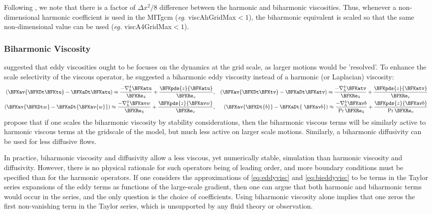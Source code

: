Following \cite{griffies:00}, we note that there is a factor of $\Delta
x^2/8$ difference between the harmonic and biharmonic viscosities.
Thus, whenever a non-dimensional harmonic coefficient is used in the
MITgcm (\textit{eg.} {\sf viscAhGridMax}$<1$), the biharmonic equivalent is
scaled so that the same non-dimensional value can be used (\textit{eg.} {\sf
  viscA4GridMax}$<1$).

\subsubsection{Biharmonic Viscosity}
\cite{ho78} suggested that eddy viscosities ought to be focuses on
the dynamics at the grid scale, as larger motions would be 'resolved'.
To enhance the scale selectivity of the viscous operator, he suggested
a biharmonic eddy viscosity instead of a harmonic (or Laplacian)
viscosity:
\begin{eqnarray}
\left({\BFKav{\BFKDt \BFKtu}}-{\BFKaDt \BFKatu}\right)\approx
\frac{-\nabla^4_h{\BFKatu}}{\BFKRe_4}
+\frac{\BFKpds{z}{\BFKatu}}{\BFKRe_v}\label{eq:bieddyvisc}, & &
\left({\BFKav{\BFKDt \BFKtv}}-{\BFKaDt \BFKatv}\right)\approx
\frac{-\nabla^4_h{\BFKatv}}{\BFKRe_4}
+\frac{\BFKpds{z}{\BFKatv}}{\BFKRe_v}\nonumber\\
\left(\BFKav{\BFKDt w}-\BFKaDt
  {\BFKav{w}}\right)\approx\frac{-\nabla^4_h\BFKav
  w}{\BFKRe_4}+\frac{\BFKpds{z}{\BFKav w}}{\BFKRe_v}\nonumber, & &
\left(\BFKav{\BFKDt{b}}-\BFKaDt{\ \BFKav b} \right)\approx
\frac{-\nabla^4_h \BFKav b}{\Pr\BFKRe_4}
+\frac{\BFKpds{z} {\BFKav b}}{\Pr\BFKRe_v}\nonumber
\end{eqnarray}
\cite{griffies:00} propose that if one scales the biharmonic viscosity by
stability considerations, then the biharmonic viscous terms will be
similarly active to harmonic viscous terms at the gridscale of the
model, but much less active on larger scale motions.  Similarly, a
biharmonic diffusivity can be used for less diffusive flows.

In practice, biharmonic viscosity and diffusivity allow a less
viscous, yet numerically stable, simulation than harmonic viscosity
and diffusivity.  However, there is no physical rationale for such
operators being of leading order, and more boundary conditions must be
specified than for the harmonic operators. If one considers the
approximations of \ref{eq:eddyvisc} and \ref{eq:bieddyvisc} to be
terms in the Taylor series expansions of the eddy terms as functions
of the large-scale gradient, then one can argue that both harmonic and
biharmonic terms would occur in the series, and the only question is
the choice of coefficients.  Using biharmonic viscosity alone implies
that one zeros the first non-vanishing term in the Taylor series,
which is unsupported by any fluid theory or observation.

